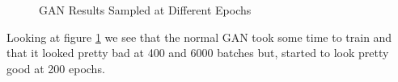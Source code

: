 \documentclass[12pt,
 reprint,
nofootinbib,
 amsmath,amssymb,
 aps,
floatfix,
]{revtex4-2}
\begin{document}
\begin{figure}[h!]
    \centering
    \qquad
    \qquad
    \caption{GAN Results Sampled at Different Epochs}%
    \label{fig:ganResults}%
\end{figure}

Looking at figure \ref{fig:ganResults} we see that the normal GAN took some time to train and that it looked pretty bad at 400 and 6000 batches but, started to look pretty good at 200 epochs. 
\end{document}
